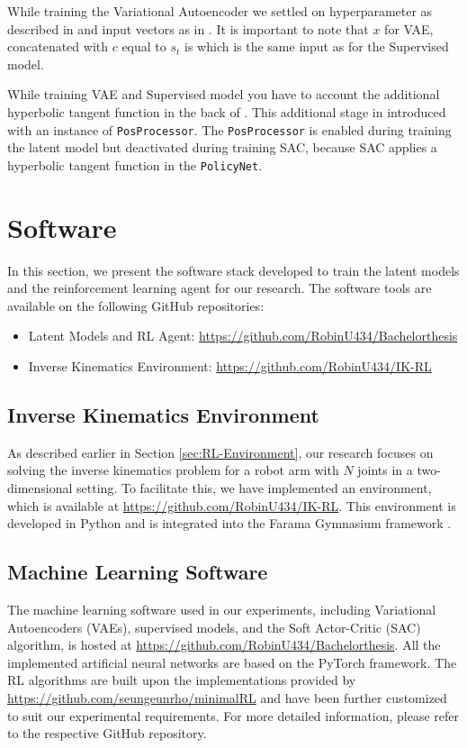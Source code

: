While training the Variational Autoencoder we settled on hyperparameter as described in  and input vectors as in . It is important to note that $x$ for VAE, concatenated with $c$ equal to $s_t$ is which is the same input as for the Supervised model. 

While training VAE and Supervised model you have to account the additional hyperbolic tangent function in the back of . This additional stage in introduced with an instance of \texttt{PosProcessor}. The \texttt{PosProcessor} is enabled during training the latent model but deactivated during training SAC, because SAC applies a hyperbolic tangent function in the \texttt{PolicyNet}. 

\section{Software}

In this section, we present the software stack developed to train the latent models and the reinforcement learning agent for our research. The software tools are available on the following GitHub repositories:

\begin{itemize}
    \item Latent Models and RL Agent: \url{https://github.com/RobinU434/Bachelorthesis}
    \item Inverse Kinematics Environment: \url{https://github.com/RobinU434/IK-RL}
\end{itemize}

\subsection{Inverse Kinematics Environment}

As described earlier in Section \ref{sec:RL-Environment}, our research focuses on solving the inverse kinematics problem for a robot arm with $N$ joints in a two-dimensional setting. To facilitate this, we have implemented an environment, which is available at \url{https://github.com/RobinU434/IK-RL}. This environment is developed in Python and is integrated into the Farama Gymnasium framework \cite{Gymnasium}.

\subsection{Machine Learning Software}

The machine learning software used in our experiments, including Variational Autoencoders (VAEs), supervised models, and the Soft Actor-Critic (SAC) algorithm, is hosted at \url{https://github.com/RobinU434/Bachelorthesis}. All the implemented artificial neural networks are based on the PyTorch framework. The RL algorithms are built upon the implementations provided by \url{https://github.com/seungeunrho/minimalRL} and have been further customized to suit our experimental requirements. For more detailed information, please refer to the respective GitHub repository.
